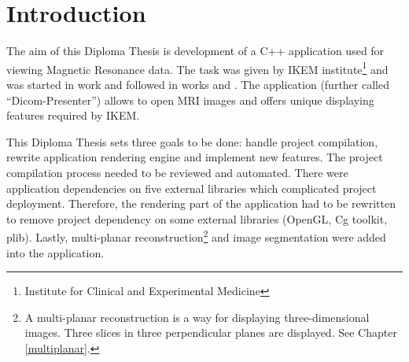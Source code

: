 \chapter{Introduction}
\vspace{-10mm}
The aim of this Diploma Thesis is development of a C++ application used for viewing Magnetic Resonance data. The task was given by IKEM institute\footnote{Institute for Clinical and Experimental Medicine} and was started in work \cite{neskudla} and followed in works \cite{flaska_bc} and \cite{flaska_vu}. The application (further called ``Dicom-Presenter'') allows to open MRI images and offers unique displaying features required by IKEM.

This Diploma Thesis sets three goals to be done: handle project compilation, rewrite application rendering engine and implement new features. The project compilation process needed to be reviewed and automated. There were application dependencies on five external libraries which complicated project deployment. Therefore, the rendering part of the application had to be rewritten to remove project dependency on some external libraries (OpenGL, Cg toolkit, plib). Lastly, multi-planar reconstruction\footnote{A multi-planar reconstruction is a way for displaying three-dimensional images. Three slices in three perpendicular planes are displayed. See Chapter \ref{multiplanar}.} and image segmentation were added into the application.
